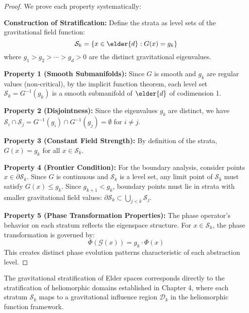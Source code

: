 \begin{proof}
We prove each property systematically:

\textbf{Construction of Stratification:}
Define the strata as level sets of the gravitational field function:
$$\mathcal{S}_k = \{x \in \elder{d} : G(x) = g_k\}$$
where $g_1 > g_2 > \cdots > g_d > 0$ are the distinct gravitational eigenvalues.

\textbf{Property 1 (Smooth Submanifolds):}
Since $G$ is smooth and $g_k$ are regular values (non-critical), by the implicit function theorem, each level set $\mathcal{S}_k = G^{-1}(g_k)$ is a smooth submanifold of $\elder{d}$ of codimension 1.

\textbf{Property 2 (Disjointness):}
Since the eigenvalues $g_k$ are distinct, we have $\mathcal{S}_i \cap \mathcal{S}_j = G^{-1}(g_i) \cap G^{-1}(g_j) = \emptyset$ for $i \neq j$.

\textbf{Property 3 (Constant Field Strength):}
By definition of the strata, $G(x) = g_k$ for all $x \in \mathcal{S}_k$.

\textbf{Property 4 (Frontier Condition):}
For the boundary analysis, consider points $x \in \partial \mathcal{S}_k$. Since $G$ is continuous and $\mathcal{S}_k$ is a level set, any limit point of $\mathcal{S}_k$ must satisfy $G(x) \leq g_k$. Since $g_{k+1} < g_k$, boundary points must lie in strata with smaller gravitational field values: $\partial \mathcal{S}_k \subset \bigcup_{j < k} \mathcal{S}_j$.

\textbf{Property 5 (Phase Transformation Properties):}
The phase operator's behavior on each stratum reflects the eigenspace structure. For $x \in \mathcal{S}_k$, the phase transformation is governed by:
$$\Phi(\mathcal{G}(x)) = g_k \cdot \Phi(x)$$
This creates distinct phase evolution patterns characteristic of each abstraction level.
\end{proof}

\begin{corollary}
The gravitational stratification of Elder spaces corresponds directly to the stratification of heliomorphic domains established in Chapter 4, where each stratum $\mathcal{S}_k$ maps to a gravitational influence region $\mathcal{D}_k$ in the heliomorphic function framework.
\end{corollary}

